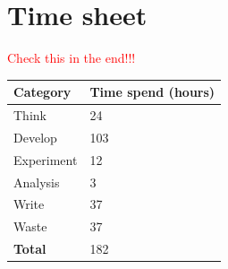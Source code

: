 \documentclass{stylesheet}
\begin{document}
\appendix
\section{Time sheet}
\label{app:time}
\textcolor{red}{Check this in the end!!!}
\begin{table}[h]
\begin{tabular}{ll}
\hline
\textbf{Category} & \textbf{Time spend (hours)} \\
\hline
Think & 24 \\
Develop & 103 \\
Experiment & 12 \\
Analysis & 3 \\
Write & 37 \\
Waste & 37 \\
\textbf{Total} & 182 \\
\hline
\end{tabular}
\end{table}
\end{document}
